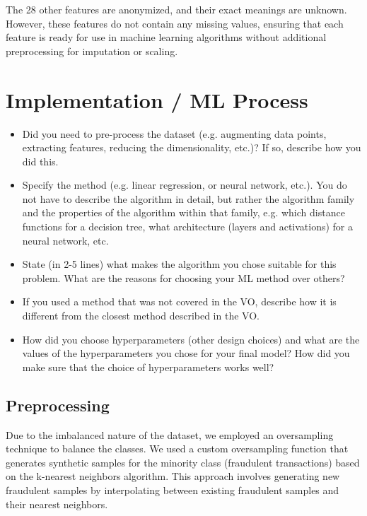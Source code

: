 \documentclass[a4, 10 pt, conference]{ieeeconf}  %
\begin{document}
The 28 other features are anonymized, and their exact meanings are unknown. However, these features do not contain any missing values, ensuring that each feature is ready for use in
machine learning algorithms without additional preprocessing for imputation or scaling.

\section{Implementation / ML Process}
\label{sec:methods}

{\color{blue}

  \begin{itemize}
    \item Did you need to pre-process the dataset (e.g. augmenting data points, extracting features, reducing the dimensionality, etc.)? If so, describe how you did this.
    \item Specify the method (e.g. linear regression, or neural network, etc.). You do not have to describe the algorithm in detail, but rather the algorithm family and the properties of the algorithm within that family, e.g. which distance functions for a decision tree, what architecture (layers and activations) for a neural network, etc.
    \item State (in 2-5 lines) what makes the algorithm you chose suitable for this problem. What are the reasons for choosing your ML method over others?
    \item If you used a method that was not covered in the VO, describe how it is different from the closest method described in the VO.
    \item How did you choose hyperparameters (other design choices) and what are the values of the hyperparameters you chose for your final model? How did you make sure that the choice of hyperparameters works well?
  \end{itemize}
}

\subsection{Preprocessing}
\label{sec:preprocess}
Due to the imbalanced nature of the dataset, we employed an oversampling technique to balance the classes. We used a custom
oversampling function that generates synthetic samples for the minority class (fraudulent transactions) based on the k-nearest
neighbors algorithm. This approach involves generating new fraudulent samples by interpolating between existing fraudulent
samples and their nearest neighbors.
\end{document}
